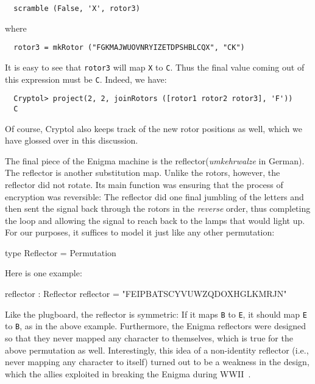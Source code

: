 \begin{Answer}
\begin{Verbatim}
  scramble (False, 'X', rotor3)
\end{Verbatim}
where
\begin{Verbatim}
  rotor3 = mkRotor ("FGKMAJWUOVNRYIZETDPSHBLCQX", "CK")
\end{Verbatim}
It is easy to see that {\tt rotor3} will map {\tt X} to {\tt C}. Thus
the final value coming out of this expression must be {\tt C}. Indeed,
we have:\indTupleProj
\begin{Verbatim}
  Cryptol> project(2, 2, joinRotors ([rotor1 rotor2 rotor3], 'F'))
  C
\end{Verbatim}
Of course, Cryptol also keeps track of the new rotor positions as
well, which we have glossed over in this discussion.
\end{Answer}


The final piece of the Enigma machine is the
reflector\indEnigmaReflector ({\em umkehrwalze} in German). The
reflector is another substitution map. Unlike the rotors, however, the
reflector did not rotate.  Its main function was ensuring that the
process of encryption was reversible: The reflector did one final
jumbling of the letters and then sent the signal back through the
rotors in the {\em reverse} order, thus completing the loop and
allowing the signal to reach back to the lamps that would light up.
For our purposes, it suffices to model it just like any other
permutation:
\begin{code}
  type Reflector = Permutation
\end{code}
Here is one example:
\begin{code}
  reflector : Reflector
  reflector = "FEIPBATSCYVUWZQDOXHGLKMRJN"
\end{code}
Like the plugboard, the reflector is symmetric: If it maps {\tt B} to
{\tt E}, it should map {\tt E} to {\tt B}, as in the above
example. Furthermore, the Enigma reflectors were designed so that they
never mapped any character to themselves, which is true for the above
permutation as well. Interestingly, this idea of a non-identity
reflector (i.e., never mapping any character to itself) turned out to
be a weakness in the design, which the allies exploited in breaking
the Enigma during WWII~\cite{Singh:1999:CBE}.

